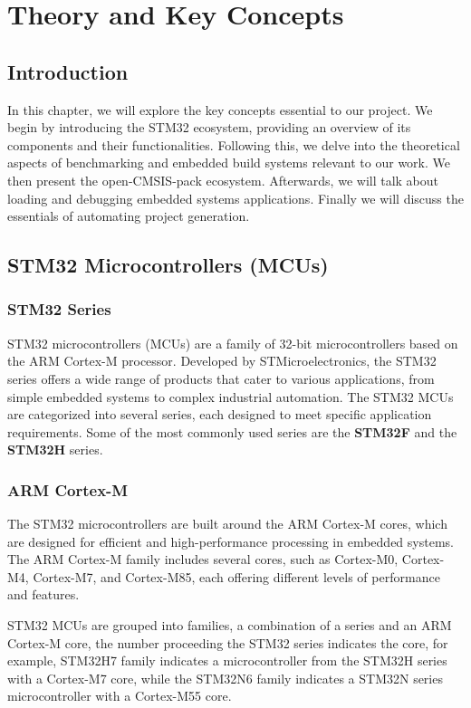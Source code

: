 \chapter{Theory and Key Concepts}

\section*{Introduction}
In this chapter, we will explore the key concepts essential to our project. We begin by introducing the STM32 ecosystem, providing an overview of its components and their functionalities. Following this, we delve into the theoretical aspects of benchmarking and embedded build systems relevant to our work. We then present the open-CMSIS-pack ecosystem. Afterwards, we will talk about loading and debugging embedded systems applications. Finally we will discuss the essentials of automating project generation.



\section{STM32 Microcontrollers (MCUs)}
\subsection{STM32 Series}
STM32 microcontrollers (MCUs) are a family of 32-bit microcontrollers based on the ARM Cortex-M processor. Developed by STMicroelectronics, the STM32 series offers a wide range of products that cater to various applications, from simple embedded systems to complex industrial automation.
The STM32 MCUs are categorized into several series, each designed to meet specific application requirements. Some of the most commonly used series are the \textbf{STM32F} and the \textbf{STM32H} series.
\subsection{ARM Cortex-M}
The STM32 microcontrollers are built around the ARM Cortex-M cores, which are designed for efficient and high-performance processing in embedded systems. 
The ARM Cortex-M family includes several cores, such as Cortex-M0, Cortex-M4, Cortex-M7, and Cortex-M85, each offering different levels of performance and features.

STM32 MCUs are grouped into families, a combination of a series and an ARM Cortex-M core, the number proceeding the STM32 series indicates the core, for example, STM32H7 family indicates a microcontroller from the STM32H series with a Cortex-M7 core, while the STM32N6 family indicates a STM32N series microcontroller with a Cortex-M55 core. 
